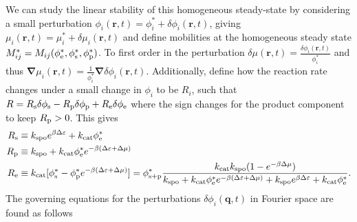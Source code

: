 We can study the linear stability of this homogeneous steady-state by considering a small perturbation $\phi_i(\bm{r},t) = \phi_i^* + \delta\phi_i(\bm{r}, t)$, giving $\mu_i(\bm{r},t) = \mu_i^* + \delta\mu_i(\bm{r},t)$ and define mobilities at the homogeneous steady state $M^*_{ij} = M_{ij}(\phi_{\mathrm{e}}^*, \phi_{\mathrm{s}}^*, \phi_{\mathrm{p}}^*)$. To first order in the perturbation $\delta\mu(\bm{r},t) = \frac{\delta\phi_i(\bm{r},t)}{\phi_i^*}$ and thus $\bm{\nabla}\mu_i(\bm{r},t) = \frac{1}{\phi_i^*}\bm{\nabla}\delta\phi_i(\bm{r},t)$. Additionally, define how the reaction rate changes under a small change in $\phi_i$ to be $R_i$, such that $R = R_\mathrm{s} \delta \phi_{\mathrm{s}} - R_\mathrm{p} \delta \phi_{\mathrm{p}} + R_\mathrm{e} \delta \phi_{\mathrm{e}}$ where the sign changes for the product component to keep $R_\mathrm{p} > 0$. This gives
\begin{align}
    R_\mathrm{s} &\equiv k_{\mathrm{spo}} e^{\beta \Delta \varepsilon} + k_{\mathrm{cat}}\phi_{\mathrm{e}}^* \\
    R_\mathrm{p} &\equiv k_{\mathrm{spo}} + k_{\mathrm{cat}}\phi_{\mathrm{e}}^*e^{-\beta (\Delta \varepsilon+\Delta \mu)} \\
    R_\mathrm{e} &\equiv k_\mathrm{cat} [ \phi_{\mathrm{s}}^* - \phi_{\mathrm{p}}^* e^{-\beta (\Delta \varepsilon + \Delta \mu)}] = \phi^*_\mathrm{s+p} \frac{k_\mathrm{cat} k_\mathrm{spo} (1-e^{-\beta \Delta \mu})}{k_\mathrm{spo} + k_\mathrm{cat} \phi_{\mathrm{e}}^* e^{-\beta (\Delta \varepsilon + \Delta \mu)} + k_\mathrm{spo} e^{\beta \Delta \varepsilon} + k_\mathrm{cat} \phi_{\mathrm{e}}^* }.
\end{align}
The governing equations for the perturbations $\delta\phi_i (\bm{q},t) $ in Fourier space are found as follows
\\
\noindent
{}
